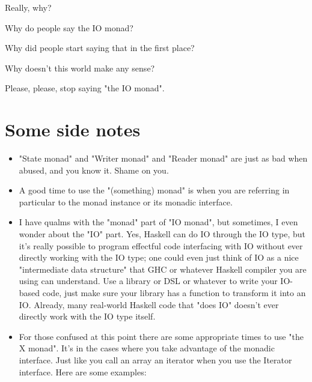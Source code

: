 \documentclass[]{article}
\begin{document}
Really, why?

Why do people say the IO monad?

Why did people start saying that in the first place?

Why doesn't this world make any sense?

Please, please, stop saying "the IO monad".

\section{Some side notes}

\begin{itemize}
\item
  "State monad" and "Writer monad" and "Reader monad" are just as bad when
  abused, and you know it. Shame on you.
\item
  A good time to use the "(something) monad" is when you are referring in
  particular to the monad instance or its monadic interface.
\item
  I have qualms with the "monad" part of "IO monad", but sometimes, I even
  wonder about the "IO" part. Yes, Haskell can do IO through the IO type, but
  it's really possible to program effectful code interfacing with IO without
  ever directly working with the IO type; one could even just think of IO as a
  nice "intermediate data structure" that GHC or whatever Haskell compiler you
  are using can understand. Use a library or DSL or whatever to write your
  IO-based code, just make sure your library has a function to transform it into
  an IO. Already, many real-world Haskell code that "does IO" doesn't ever
  directly work with the IO type itself.
\item
  For those confused at this point there are some appropriate times to use "the
  X monad". It's in the cases where you take advantage of the monadic interface.
  Just like you call an array an iterator when you use the Iterator interface.
  Here are some examples:


\end{itemize}
\end{document}
